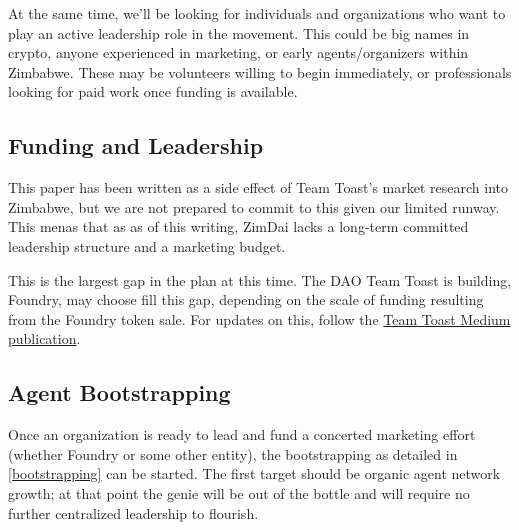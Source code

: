 \documentclass{article}
\begin{document}
At the same time, we'll be looking for individuals and organizations who want to play an active leadership role in the movement. This could be big names in crypto, anyone experienced in marketing, or early agents/organizers within Zimbabwe. These may be volunteers willing to begin immediately, or professionals looking for paid work once funding is available.

\subsection{Funding and Leadership} \label{funding and organization}

This paper has been written as a side effect of Team Toast's market research into Zimbabwe, but we are not prepared to commit to this given our limited runway. This menas that as as of this writing, ZimDai lacks a long-term committed leadership structure and a marketing budget.

This is the largest gap in the plan at this time. The DAO Team Toast is building, Foundry, may choose fill this gap, depending on the scale of funding resulting from the Foundry token sale. For updates on this, follow the \href{https://medium.com/daihard-buidlers}{Team Toast Medium publication}.

\subsection{Agent Bootstrapping} \label{agent bootstrapping}

Once an organization is ready to lead and fund a concerted marketing effort (whether Foundry or some other entity), the bootstrapping as detailed in \ref{bootstrapping} can be started. The first target should be organic agent network growth; at that point the genie will be out of the bottle and will require no further centralized leadership to flourish.
\end{document}
